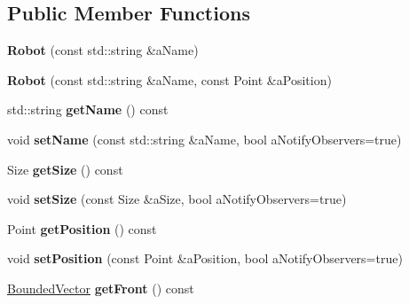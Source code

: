 \subsection*{Public Member Functions}
\begin{DoxyCompactItemize}
\item 
{\bfseries Robot} (const std\+::string \&a\+Name)\hypertarget{class_model_1_1_robot_a9fb211152f3e75c65eafd1550e90203f}{}\label{class_model_1_1_robot_a9fb211152f3e75c65eafd1550e90203f}

\item 
{\bfseries Robot} (const std\+::string \&a\+Name, const Point \&a\+Position)\hypertarget{class_model_1_1_robot_ac7afa4c9bc8982bd7e5918ed4c9173d2}{}\label{class_model_1_1_robot_ac7afa4c9bc8982bd7e5918ed4c9173d2}

\item 
std\+::string {\bfseries get\+Name} () const \hypertarget{class_model_1_1_robot_acbaa390189fe54d71c5ca1db809f10b0}{}\label{class_model_1_1_robot_acbaa390189fe54d71c5ca1db809f10b0}

\item 
void {\bfseries set\+Name} (const std\+::string \&a\+Name, bool a\+Notify\+Observers=true)\hypertarget{class_model_1_1_robot_ac39ad2cbd403962eebe60fd9dd4a1171}{}\label{class_model_1_1_robot_ac39ad2cbd403962eebe60fd9dd4a1171}

\item 
Size {\bfseries get\+Size} () const \hypertarget{class_model_1_1_robot_add846e39a98489592f07b456a06396db}{}\label{class_model_1_1_robot_add846e39a98489592f07b456a06396db}

\item 
void {\bfseries set\+Size} (const Size \&a\+Size, bool a\+Notify\+Observers=true)\hypertarget{class_model_1_1_robot_aa9053536ee4aa3c58883f1fe14d46c1f}{}\label{class_model_1_1_robot_aa9053536ee4aa3c58883f1fe14d46c1f}

\item 
Point {\bfseries get\+Position} () const \hypertarget{class_model_1_1_robot_a02a103f767306bce47f60127ceddf171}{}\label{class_model_1_1_robot_a02a103f767306bce47f60127ceddf171}

\item 
void {\bfseries set\+Position} (const Point \&a\+Position, bool a\+Notify\+Observers=true)\hypertarget{class_model_1_1_robot_a2d983199228926b70bc2dfa4dbbab006}{}\label{class_model_1_1_robot_a2d983199228926b70bc2dfa4dbbab006}

\item 
\hyperlink{class_model_1_1_bounded_vector}{Bounded\+Vector} {\bfseries get\+Front} () const \hypertarget{class_model_1_1_robot_a85ab146591702b24ab8bd9b2ff960a2f}{}\label{class_model_1_1_robot_a85ab146591702b24ab8bd9b2ff960a2f}


\end{DoxyCompactItemize}
